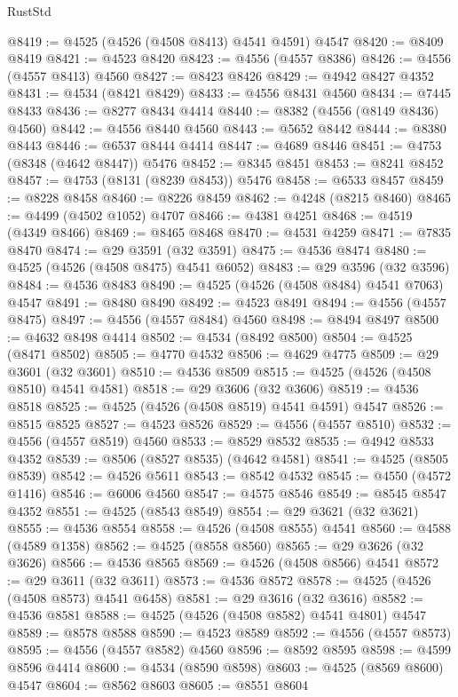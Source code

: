\begin{lexlean}{RustStd}
\begin{coremodule}
{\begin{coremodule}
{{{{{{{{{{{{{{{{{{{{{{{{{{{{{{{{{{{{{{{{{{{{{{{{{{{{{{{@8419 := @4525 (@4526 (@4508 @8413) @4541 @4591) @4547
@8420 := @8409 @8419
@8421 := @4523 @8420
@8423 := @4556 (@4557 @8386)
@8426 := @4556 (@4557 @8413) @4560
@8427 := @8423 @8426
@8429 := @4942 @8427 @4352
@8431 := @4534 (@8421 @8429)
@8433 := @4556 @8431 @4560
@8434 := @7445 @8433
@8436 := @8277 @8434 @4414
@8440 := @8382 (@4556 (@8149 @8436) @4560)
@8442 := @4556 @8440 @4560
@8443 := @5652 @8442
@8444 := @8380 @8443
@8446 := @6537 @8444 @4414
@8447 := @4689 @8446
@8451 := @4753 (@8348 (@4642 @8447)) @5476
@8452 := @8345 @8451
@8453 := @8241 @8452
@8457 := @4753 (@8131 (@8239 @8453)) @5476
@8458 := @6533 @8457
@8459 := @8228 @8458
@8460 := @8226 @8459
@8462 := @4248 (@8215 @8460)
@8465 := @4499 (@4502 @1052) @4707
@8466 := @4381 @4251
@8468 := @4519 (@4349 @8466)
@8469 := @8465 @8468
@8470 := @4531 @4259
@8471 := @7835 @8470
@8474 := @29 @3591 (@32 @3591)
@8475 := @4536 @8474
@8480 := @4525 (@4526 (@4508 @8475) @4541 @6052)
@8483 := @29 @3596 (@32 @3596)
@8484 := @4536 @8483
@8490 := @4525 (@4526 (@4508 @8484) @4541 @7063) @4547
@8491 := @8480 @8490
@8492 := @4523 @8491
@8494 := @4556 (@4557 @8475)
@8497 := @4556 (@4557 @8484) @4560
@8498 := @8494 @8497
@8500 := @4632 @8498 @4414
@8502 := @4534 (@8492 @8500)
@8504 := @4525 (@8471 @8502)
@8505 := @4770 @4532
@8506 := @4629 @4775
@8509 := @29 @3601 (@32 @3601)
@8510 := @4536 @8509
@8515 := @4525 (@4526 (@4508 @8510) @4541 @4581)
@8518 := @29 @3606 (@32 @3606)
@8519 := @4536 @8518
@8525 := @4525 (@4526 (@4508 @8519) @4541 @4591) @4547
@8526 := @8515 @8525
@8527 := @4523 @8526
@8529 := @4556 (@4557 @8510)
@8532 := @4556 (@4557 @8519) @4560
@8533 := @8529 @8532
@8535 := @4942 @8533 @4352
@8539 := @8506 (@8527 @8535) (@4642 @4581)
@8541 := @4525 (@8505 @8539)
@8542 := @4526 @5611
@8543 := @8542 @4532
@8545 := @4550 (@4572 @1416)
@8546 := @6006 @4560
@8547 := @4575 @8546
@8549 := @8545 @8547 @4352
@8551 := @4525 (@8543 @8549)
@8554 := @29 @3621 (@32 @3621)
@8555 := @4536 @8554
@8558 := @4526 (@4508 @8555) @4541
@8560 := @4588 (@4589 @1358)
@8562 := @4525 (@8558 @8560)
@8565 := @29 @3626 (@32 @3626)
@8566 := @4536 @8565
@8569 := @4526 (@4508 @8566) @4541
@8572 := @29 @3611 (@32 @3611)
@8573 := @4536 @8572
@8578 := @4525 (@4526 (@4508 @8573) @4541 @6458)
@8581 := @29 @3616 (@32 @3616)
@8582 := @4536 @8581
@8588 := @4525 (@4526 (@4508 @8582) @4541 @4801) @4547
@8589 := @8578 @8588
@8590 := @4523 @8589
@8592 := @4556 (@4557 @8573)
@8595 := @4556 (@4557 @8582) @4560
@8596 := @8592 @8595
@8598 := @4599 @8596 @4414
@8600 := @4534 (@8590 @8598)
@8603 := @4525 (@8569 @8600) @4547
@8604 := @8562 @8603
@8605 := @8551 @8604
}}}}}}}}}}}}}}}}}}}}}}}}}}}}}}}}}}}}}}}}}}}}}}}}}}}}}}}
\end{coremodule}}
\end{coremodule}
\end{lexlean}

